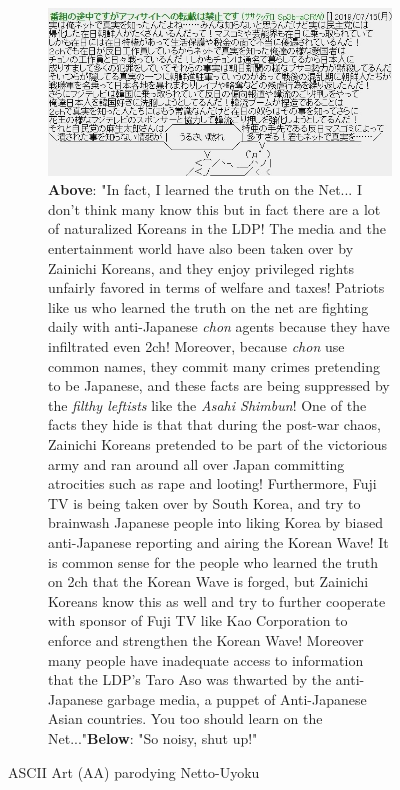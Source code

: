 \documentclass[10pt,british,A4paper,,openany]{memoir}
\begin{document}
\begin{figure}[!htb]
 \centering
 \begin{subfigure}[b]{0.95\textwidth}
  \includegraphics[width=\textwidth]{images/2channel/anti-aa.jpg}
  \caption*{\textbf{Above}: "In fact, I learned the truth on the Net... I don't think many know this but in fact there are a lot of naturalized Koreans in the LDP! The media and the entertainment world have also been taken over by Zainichi Koreans, and they enjoy privileged rights unfairly favored in terms of welfare and taxes! Patriots like us who learned the truth on the net are fighting daily with anti-Japanese \textit{chon} agents because they have infiltrated even 2ch! Moreover, because \textit{chon} use common names, they commit many crimes pretending to be Japanese, and these facts are being suppressed by the \textit{filthy leftists} like the \textit{Asahi Shimbun}! One of the facts they hide is that that during the post-war chaos, Zainichi Koreans pretended to be part of the victorious army and ran around all over Japan committing atrocities such as rape and looting! Furthermore, Fuji TV is being taken over by South Korea, and try to brainwash Japanese people into liking Korea by biased anti-Japanese reporting and airing the Korean Wave! It is common sense for the people who learned the truth on 2ch that the Korean Wave is forged, but Zainichi Koreans know this as well and try to further cooperate with sponsor of Fuji TV like Kao Corporation to enforce and strengthen the Korean Wave! Moreover many people have inadequate access to information that the LDP's Taro Aso was thwarted by the anti-Japanese garbage media, a puppet of Anti-Japanese Asian countries. You too should learn on the Net..."\newline \textbf{Below}: "So noisy, shut up!"}
  \label{fig:aajp}
 \end{subfigure}
 \caption{ASCII Art (AA) parodying Netto-Uyoku}\label{fig:aa}
\end{figure}
\end{document}
